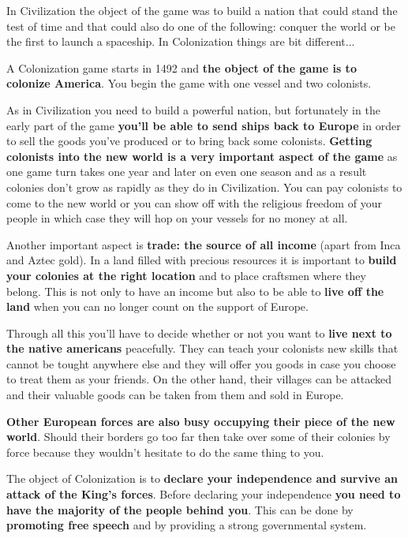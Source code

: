 \documentclass[12pt]{book}
\begin{document}
In Civilization the object of the game was to build a nation that
could stand the test of time and that could also do one of the
following: conquer the world or be the first to launch a
spaceship. In Colonization things are bit different...

A Colonization game starts in 1492 and \textbf{the object of the game
is to colonize America}. You begin the game with one vessel and two
colonists.

As in Civilization you need to build a powerful nation, but
fortunately in the early part of the game \textbf{you'll be able to
send ships back to Europe} in order to sell the goods you've produced
or to bring back some colonists. \textbf{Getting colonists into the
new world is a very important aspect of the game} as one game turn
takes one year and later on even one season and as a result colonies
don't grow as rapidly as they do in Civilization. You can pay
colonists to come to the new world or you can show off with the
religious freedom of your people in which case they will hop on your
vessels for no money at all.

Another important aspect is \textbf{trade: the source of all income}
(apart from Inca and Aztec gold). In a land filled with precious
resources it is important to \textbf{build your colonies at the right
location} and to place craftsmen where they belong. This is not only
to have an income but also to be able to \textbf{live off the land}
when you can no longer count on the support of Europe.

Through all this you'll have to decide whether or not you want to
\textbf{live next to the native americans} peacefully. They can teach
your colonists new skills that cannot be tought anywhere else and they
will offer you goods in case you choose to treat them as your
friends. On the other hand, their villages can be attacked and their
valuable goods can be taken from them and sold in Europe.

\textbf{Other European forces are also busy occupying their piece of
the new world}. Should their borders go too far then take over some
of their colonies by force because they wouldn't hesitate to do the
same thing to you.

The object of Colonization is to \textbf{declare your independence and
survive an attack of the King's forces}. Before declaring your
independence \textbf{you need to have the majority of the people
behind you}. This can be done by \textbf{promoting free speech} and by
providing a strong governmental system.
\end{document}
